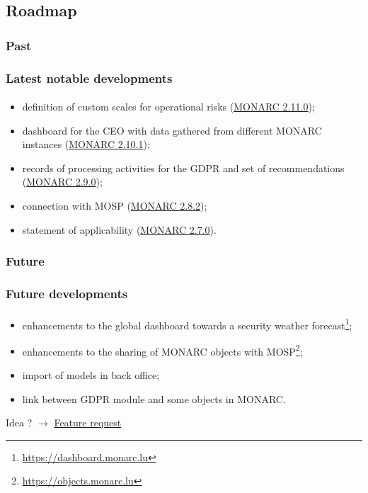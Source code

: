 \subsection{Roadmap}
\subsubsection{Past}
\begin{frame}
  \frametitle{Latest notable developments}
  \framesubtitle{}
  \begin{itemize}
    \item definition of custom scales for operational risks
      (\href{https://www.monarc.lu/news/2021/09/02/monarc-2110-released/}{MONARC 2.11.0});
    \item dashboard for the CEO with data gathered from different MONARC instances
      (\href{https://www.monarc.lu/news/2020/12/18/monarc-2101-released/}{MONARC 2.10.1});
    \item records of processing activities for the GDPR and set of recommendations
      (\href{https://www.monarc.lu/news/2019/08/23/monarc-290-released/}{MONARC 2.9.0});
    \item connection with MOSP
      (\href{https://www.monarc.lu/news/2019/05/28/monarc-282-released/}{MONARC 2.8.2});
    \item statement of applicability
      (\href{https://www.monarc.lu/news/2018/08/22/monarc-270-released/}{MONARC 2.7.0}).
  \end{itemize}
\end{frame}

\subsubsection{Future}
\begin{frame}
  \frametitle{Future developments}
  \framesubtitle{}
  \begin{itemize}
    \item enhancements to the global dashboard towards a
    security weather forecast\footnote{\url{https://dashboard.monarc.lu}};
    \item enhancements to the sharing of MONARC objects with
    MOSP\footnote{\url{https://objects.monarc.lu}};
    \item import of models in back office;
    \item link between GDPR module and some objects in MONARC.
  \end{itemize}
  \bigskip
  Idea ?
  $\rightarrow$
  \href{https://github.com/monarc-project/MonarcAppFO/issues/new?labels=feature+request}{Feature request}
\end{frame}
